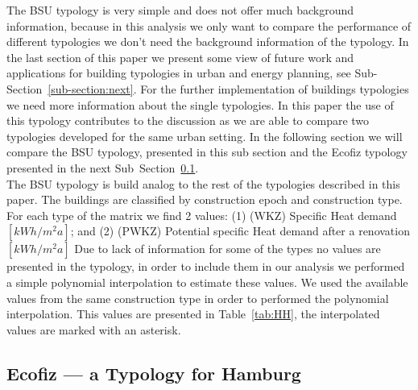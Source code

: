 \documentclass[authoryear,preprint,review,12pt]{elsarticle}
\begin{document}
\begin{linenumbers}
The BSU typology is very simple and does not offer much background information,
because in this analysis we only want to compare the performance of different
typologies we don't need the background information of the typology.  In the
last section of this paper we present some view of future work and applications
for building typologies in urban and energy planning, see
Sub-Section~\ref{sub-section:next}.  For the further implementation of
buildings typologies we need more information about the single typologies.  In
this paper the use of this typology contributes to the discussion as we are
able to compare two typologies developed for the same urban setting.  In the
following section we will compare the BSU typology, presented in this sub
section and the Ecofiz typology presented in the next
Sub~Section~\ref{sub-sec:ecofiz}.\\

The BSU typology is build analog to the rest of the typologies described in
this paper.  The buildings are classified by construction epoch and
construction type.  For each type of the matrix we find 2 values: (1) (WKZ)
Specific Heat demand $[kWh/m^{2}a]$; and (2) (PWKZ) Potential specific Heat
demand after a renovation $[kWh/m^{2}a]$ Due to lack of information for some of
the types no values are presented in the typology, in order to include them in
our analysis we performed a simple polynomial interpolation to estimate these
values.  We used the available values from the same construction type in order
to performed the polynomial interpolation.  This values are presented in
Table~\ref{tab:HH}, the interpolated values are marked with an asterisk.\\



\subsection{Ecofiz --- a Typology for Hamburg}\label{sub-sec:ecofiz}


\end{linenumbers}
\end{document}
